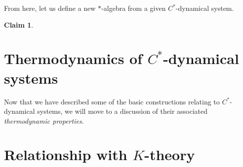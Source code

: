 \documentclass[aps,pra,showpacs,notitlepage,onecolumn,superscriptaddress,nofootinbib]{revtex4-1}
\theoremstyle{definition}
\newtheorem{claim}{Claim}[section]
\begin{document}
\noindent From here, let us define a new $*$-algebra from a given $C^{*}$-dynamical system.

\begin{claim}
  \end{claim}

\noindent

\section{Thermodynamics of $C^{*}$-dynamical systems}

\noindent Now that we have described some of the basic constructions relating to $C^{*}$-dynamical systems, we will move to a discussion of their associated \emph{thermodynamic properties}.


\section{Relationship with $K$-theory}
\end{document}
